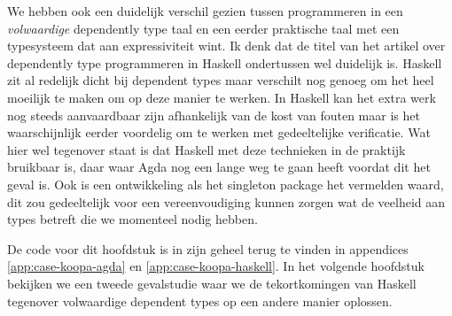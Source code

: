 We hebben ook een duidelijk verschil gezien tussen programmeren in een
\emph{volwaardige} dependently type taal en een eerder praktische taal met een
typesysteem dat aan expressiviteit wint. Ik denk dat de titel van het artikel
over dependently type programmeren in Haskell ondertussen wel duidelijk is.
Haskell zit al redelijk dicht bij dependent types maar verschilt nog genoeg om
het heel moeilijk te maken om op deze manier te werken. In Haskell kan het
extra werk nog steeds aanvaardbaar zijn afhankelijk van de kost van fouten maar
is het waarschijnlijk eerder voordelig om te werken met gedeeltelijke
verificatie. Wat hier wel tegenover staat is dat Haskell met deze technieken in
de praktijk bruikbaar is, daar waar Agda nog een lange weg te gaan heeft
voordat dit het geval is. Ook is een ontwikkeling als het singleton package
\cite{singletonpack} het vermelden waard, dit zou gedeeltelijk voor een
vereenvoudiging kunnen zorgen wat de veelheid aan types betreft die we
momenteel nodig hebben.

De code voor dit hoofdstuk is in zijn geheel terug te vinden in appendices
\ref{app:case-koopa-agda} en \ref{app:case-koopa-haskell}. In het volgende
hoofdstuk bekijken we een tweede gevalstudie waar we de tekortkomingen van
Haskell tegenover volwaardige dependent types op een andere manier oplossen.

